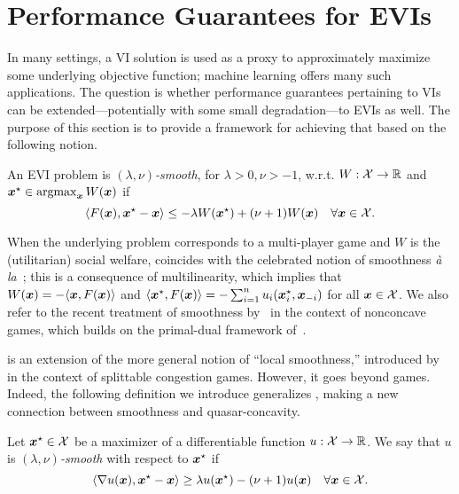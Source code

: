 \section{Performance Guarantees for EVIs}
\label{sec:smoothness}

In many settings, a VI solution is used as a proxy to approximately maximize some underlying objective function; machine learning offers many such applications. The question is whether performance guarantees pertaining to VIs can be extended---potentially with some small degradation---to EVIs as well. The purpose of this section is to provide a framework for achieving that based on the following notion.

\begin{definition}
    \label{def:smoothness}
    An EVI problem is \emph{$(\lambda, \nu)$-smooth}, for $\lambda > 0, \nu > -1$, w.r.t. $W : {\mathcal{X}} \to \mathbb R$ and ${\bm{x}}^\star \in \operatorname*{argmax}_{{\bm{x}}} W({\bm{x}})$ if
    \begin{equation*}
        \langle F({\bm{x}}), {\bm{x}}^\star - {\bm{x}} \rangle \leq -  \lambda W({\bm{x}}^\star) + (\nu+1) W({\bm{x}}) \quad \forall {\bm{x}} \in {\mathcal{X}}.
    \end{equation*}
\end{definition}

\begin{example}
    When the underlying problem corresponds to a multi-player game and $W$ is the (utilitarian) social welfare,  coincides with the celebrated notion of smoothness \emph{\`a la}~\citet{Roughgarden15:Intrinsic}; this is a consequence of multilinearity, which implies that $W({\bm{x}}) = -\langle {\bm{x}}, F({\bm{x}}) \rangle$ and $ \langle {\bm{x}}^\star, F({\bm{x}}) \rangle = - \sum_{i=1}^n u_i({\bm{x}}^\star_i, {\bm{x}}_{-i})$ for all ${\bm{x}} \in {\mathcal{X}}$. We also refer to the recent treatment of smoothness by~\citet{Ahunbay25:First} in the context of nonconcave games, which builds on the primal-dual framework of~\citet{Nadav10:Limits}.
\end{example}

 is an extension of the more general notion of ``local smoothness,'' introduced by~\citet{Roughgarden15:Local} in the context of splittable congestion games. However, it goes beyond games. Indeed, the following definition we introduce generalizes , making a new connection between smoothness and quasar-concavity.

\begin{definition}
    \label{def:smooth-fun}
    Let ${\bm{x}}^\star \in {\mathcal{X}}$ be a maximizer of a differentiable function $u : {\mathcal{X}} \to \mathbb R$. We say that $u$ is \emph{$(\lambda, \nu)$-smooth} with respect to ${\bm{x}}^\star$ if
    \begin{equation*}
        \langle \nabla u({\bm{x}}), {\bm{x}}^\star - {\bm{x}} \rangle \geq \lambda u({\bm{x}}^\star) - (\nu + 1) u({\bm{x}}) \quad \forall {\bm{x}} \in {\mathcal{X}}.
    \end{equation*}
\end{definition}

